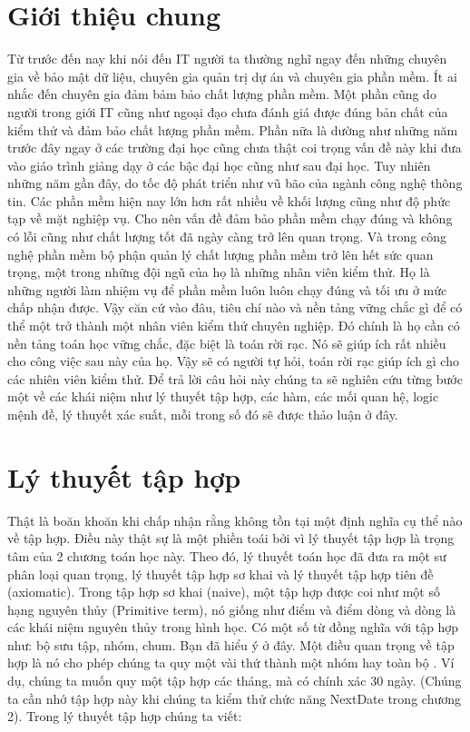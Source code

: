 \documentclass[11pt,a4paper,oneside]{article}
\begin{document}
\section{Giới thiệu chung}       %
Từ trước đến nay khi nói đến IT người ta thường nghĩ ngay đến những chuyên gia về bảo mật dữ liệu, chuyên gia quản trị dự án và chuyên gia phần mềm. Ít ai nhắc đến chuyên gia đảm bảm bảo chất lượng phần mềm. Một phần cũng do người trong giới IT cũng như ngoại đạo chưa đánh giá được đúng bản chất của kiểm thử và đảm bảo chất lượng phần mềm. Phần nữa là dường như những năm trước đây ngay ở các trường đại học cũng chưa thật coi trọng vấn đề này khi đưa vào giáo trình giảng dạy ở các bậc đại học cũng như sau đại học. Tuy nhiên những năm gần đây, do tốc độ phát triển như vũ bão của ngành công nghệ thông tin. Các phần mềm hiện nay lớn hơn rất nhiều về khối lượng cũng như độ phức tạp về mặt nghiệp vụ. Cho nên vấn đề đảm bảo phần mềm chạy đúng và không có lỗi cũng như chất lượng tốt đã ngày càng trở lên quan trọng. Và trong công nghệ phần mềm bộ phận quản lý chất lượng phần mềm trở lên hết sức quan trọng, một trong những đội ngũ của họ là những nhân viên kiểm thử. Họ là những người làm nhiệm vụ để phần mềm luôn luôn chạy đúng và tối ưu ở mức chấp nhận được. Vậy căn cứ vào đâu, tiêu chí nào và nền tảng vững chắc gì để có thể một trở thành một nhân viên kiểm thử chuyên nghiệp. Đó chính là họ cần có nền tảng toán học vững chắc, đặc biệt là toán rời rạc. Nó sẽ giúp ích rất nhiều cho công việc sau này của họ. Vậy sẽ có người tự hỏi, toán rời rạc giúp ích gì cho các nhiên viên kiểm thử. Để trả lời câu hỏi này chúng ta sẽ nghiên cứu từng bước một về các khái niệm như lý thuyết tập hợp, các hàm, các mối quan hệ, logic mệnh đề, lý thuyết xác suất, mỗi trong số đó sẽ được thảo luận ở đây.
\section{Lý thuyết tập hợp} 

Thật là boăn khoăn khi chấp nhận rằng không tồn tại một định nghĩa cụ thể nào về tập hợp. Điều này thật sự là một phiền toái bởi vì lý thuyết tập hợp là trọng tâm của 2 chương toán học này. Theo đó, lý thuyết toán học đã đưa ra một sư phân loại quan trọng, lý thuyết tập hợp sơ khai và lý thuyết tập hợp tiên đề (axiomatic). Trong tập hợp sơ khai (naive), một tập hợp được coi như một số hạng nguyên thủy (Primitive term), nó giống như điểm và điểm dòng và dòng là các khái niệm nguyên thủy trong hình học. Có một số từ đồng nghĩa với tập hợp như: bộ sưu tập, nhóm, chum. Bạn đã hiểu ý ở đây. Một điều quan trọng về tập hợp là nó cho phép chúng ta quy một vài thứ thành một nhóm hay toàn bộ . Ví dụ, chúng ta muốn quy một tập hợp các tháng, mà có chính xác 30 ngày. (Chúng ta cần nhớ tập hợp này khi chúng ta kiểm thử chức năng NextDate trong chương 2). Trong lý thuyết tập hợp chúng ta viết:
\end{document}
